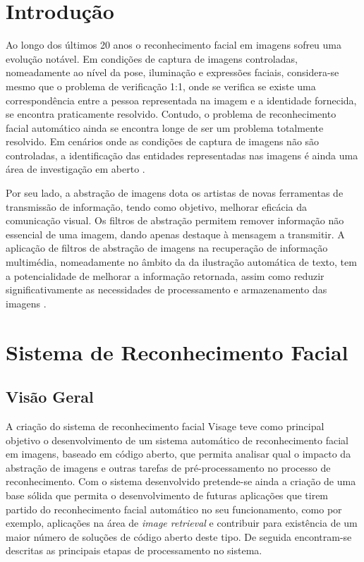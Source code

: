 \documentclass[9pt,a4paper]{extarticle}
\begin{document}
\begin{multicols}{2}

\section{Introdução}
Ao longo dos últimos 20 anos o reconhecimento facial em imagens sofreu uma evolução notável. Em condições de captura de imagens controladas, nomeadamente ao nível da pose, iluminação e expressões faciais, considera-se mesmo que o problema de verificação 1:1, onde se verifica se existe uma correspondência entre a pessoa representada na imagem e a identidade fornecida, se encontra praticamente resolvido. Contudo, o problema de reconhecimento facial automático ainda se encontra longe de ser um problema totalmente resolvido. Em cenários onde as condições de captura de imagens não são controladas, a identificação das entidades representadas nas imagens é ainda uma área de investigação em aberto \cite{Li2011}.

Por seu lado, a abstração de imagens dota os artistas de novas ferramentas de transmissão de informação, tendo como objetivo, melhorar eficácia da comunicação visual. Os filtros de abstração permitem remover informação não essencial de uma imagem, dando apenas destaque à mensagem a transmitir. A aplicação de filtros de abstração de imagens na recuperação de informação multimédia, nomeadamente no âmbito da da ilustração automática de texto, tem a potencialidade de melhorar a informação retornada, assim como reduzir significativamente as necessidades de processamento e armazenamento das imagens \cite{Coelho:2012:IAC:2260641.2260676}. 


\section{Sistema de Reconhecimento Facial}

\subsection{Visão Geral}
A criação do sistema de reconhecimento facial Visage teve como principal objetivo o desenvolvimento de um sistema automático de reconhecimento facial em imagens, baseado em código aberto, que permita analisar qual o impacto da abstração de imagens e outras tarefas de pré-processamento no processo de reconhecimento. Com o sistema desenvolvido pretende-se ainda a criação de uma base sólida que permita o desenvolvimento de futuras aplicações que tirem partido do reconhecimento facial automático no seu funcionamento, como por exemplo, aplicações na área de \textit{image retrieval} e contribuir para existência de um maior número de soluções de código aberto deste tipo. De seguida encontram-se descritas as principais etapas de processamento no sistema.


\end{multicols}
\end{document}
